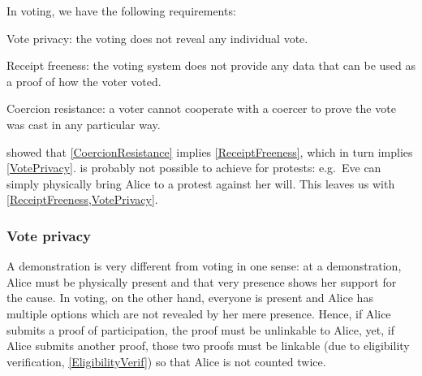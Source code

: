 In voting, we have the following requirements:
\begin{frame}
\begin{requirements}[P]
\item\label{VotePrivacy} Vote privacy: the voting does not reveal any 
  individual vote.
\item\label{ReceiptFreeness} Receipt freeness: the voting system does not 
  provide any data that can be used as a proof of how the voter voted.
\item\label{CoercionResistance} Coercion resistance: a voter cannot cooperate 
  with a coercer to prove the vote was cast in any particular way.
\end{requirements}
\pause{}
\end{frame}
\Textcite{VerifyingPrivacyPropertiesOfVotingProtocols} showed that 
\cref{CoercionResistance} implies \cref{ReceiptFreeness}, which in turn implies
\cref{VotePrivacy}.
 is probably not possible to achieve for protests:
e.g.\ Eve can simply physically bring Alice to a protest against her will.
This leaves us with \cref{ReceiptFreeness,VotePrivacy}.


\subsubsection{Vote privacy}

A demonstration is very different from voting in one sense: at a demonstration, 
Alice must be physically present and that very presence shows her support for 
the cause.
In voting, on the other hand, everyone is present and Alice has multiple 
options which are not revealed by her mere presence.
Hence, if Alice submits a proof of participation, the proof must be unlinkable 
to Alice, yet, if Alice submits another proof, those two proofs must be 
linkable (due to eligibility verification, \cref{EligibilityVerif}) so that 
Alice is not counted twice.

